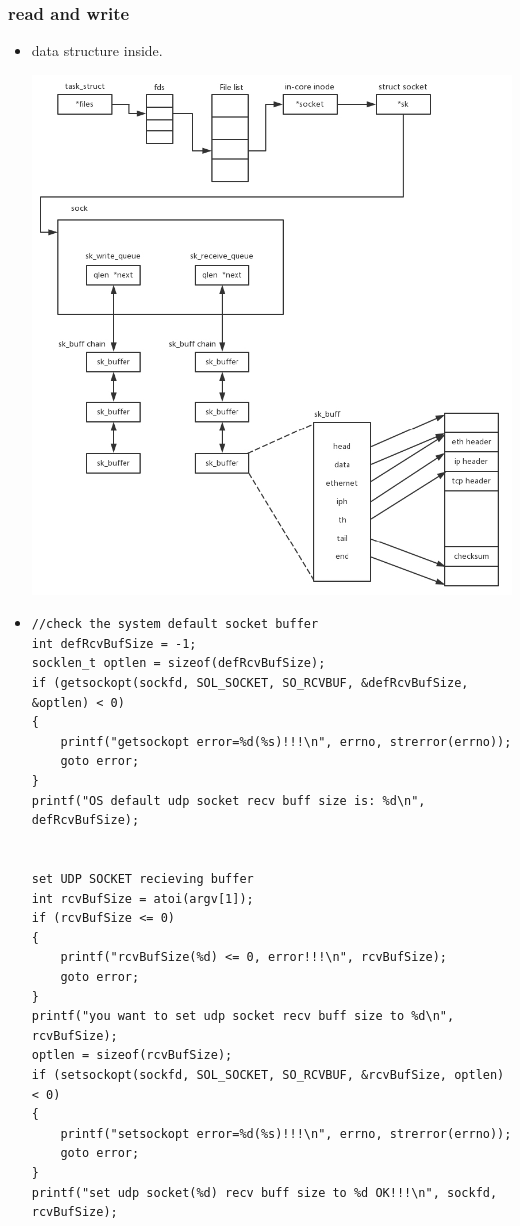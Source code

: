 \documentclass[a4paper,11pt,twoside]{book}
\begin{document}
\subsubsection{read and write}
\begin{itemize}
		\item data structure inside.
	\begin{center}
		\includegraphics[width=0.85\linewidth]{pics/socket_inside.png}
	\end{center}
	
	
	\item 
\begin{lstlisting}
//check the system default socket buffer
int defRcvBufSize = -1;
socklen_t optlen = sizeof(defRcvBufSize);
if (getsockopt(sockfd, SOL_SOCKET, SO_RCVBUF, &defRcvBufSize, &optlen) < 0)
{
	printf("getsockopt error=%d(%s)!!!\n", errno, strerror(errno));
	goto error;
}
printf("OS default udp socket recv buff size is: %d\n", defRcvBufSize);


set UDP SOCKET recieving buffer
int rcvBufSize = atoi(argv[1]);
if (rcvBufSize <= 0)
{
	printf("rcvBufSize(%d) <= 0, error!!!\n", rcvBufSize);
	goto error;
}
printf("you want to set udp socket recv buff size to %d\n", rcvBufSize);
optlen = sizeof(rcvBufSize);
if (setsockopt(sockfd, SOL_SOCKET, SO_RCVBUF, &rcvBufSize, optlen) < 0)
{
	printf("setsockopt error=%d(%s)!!!\n", errno, strerror(errno));
	goto error;
}
printf("set udp socket(%d) recv buff size to %d OK!!!\n", sockfd, rcvBufSize);



\end{lstlisting}
\end{itemize}
\end{document}
